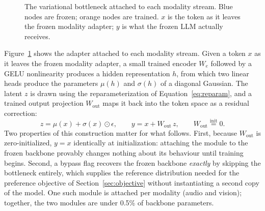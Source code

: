 \documentclass[11pt,a4paper,oneside]{article}
\begin{document}
\begin{figure}[h]
\centering
{}
\caption{The variational bottleneck attached to each modality stream. Blue nodes are frozen; orange
nodes are trained. $x$ is the token as it leaves the frozen modality adapter; $y$ is what the frozen
LLM actually receives.}
\label{fig:arch}
\end{figure}

Figure~\ref{fig:arch} shows the adapter attached to each modality stream. Given a token $x$ as it
leaves the frozen modality adapter, a small trained encoder $W_e$ followed by a GELU nonlinearity
produces a hidden representation $h$, from which two linear heads produce the parameters $\mu(h)$ and
$\sigma(h)$ of a diagonal Gaussian. The latent $z$ is drawn using the reparameterization of
Equation~\eqref{eq:reparam}, and a trained output projection $W_{\text{out}}$ maps it back into the
token space as a residual correction:
\begin{equation}
z = \mu(x) + \sigma(x)\odot\epsilon, \qquad y = x + W_{\text{out}}\,z, \qquad
W_{\text{out}} \stackrel{\text{init}}{=} 0.
\label{eq:bottleneck}
\end{equation}
Two properties of this construction matter for what follows. First, because $W_{\text{out}}$ is
zero-initialized, $y=x$ identically at initialization: attaching the module to the frozen backbone
provably changes nothing about its behaviour until training begins. Second, a bypass flag recovers
the frozen backbone \emph{exactly} by skipping the bottleneck entirely, which supplies the reference
distribution needed for the preference objective of Section~\ref{sec:objective} without
instantiating a second copy of the model. One such module is attached per modality (audio and
vision); together, the two modules are under 0.5\% of backbone parameters.
\end{document}
